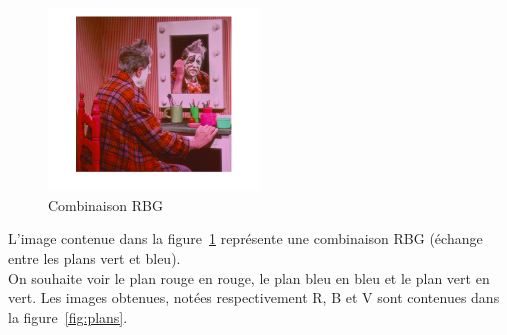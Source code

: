 \documentclass[a4paper]{article}
\newcommand{\figref}[1]{figure~\ref{#1}}
\begin{document}
\begin{figure}[H]
	\center 
	\includegraphics[width=0.5\textwidth]{images/Question3RBG.png}
    \caption{Combinaison RBG}
    \label{fig:RBG}
\end{figure}

L'image contenue dans la \figref{fig:RBG} représente une combinaison RBG
(échange entre les plans vert et bleu). \\

On souhaite voir le plan rouge en rouge, le plan bleu en bleu et le plan vert en
vert. Les images obtenues, notées respectivement R, B et V sont contenues dans
la \figref{fig:plans}.
\end{document}
